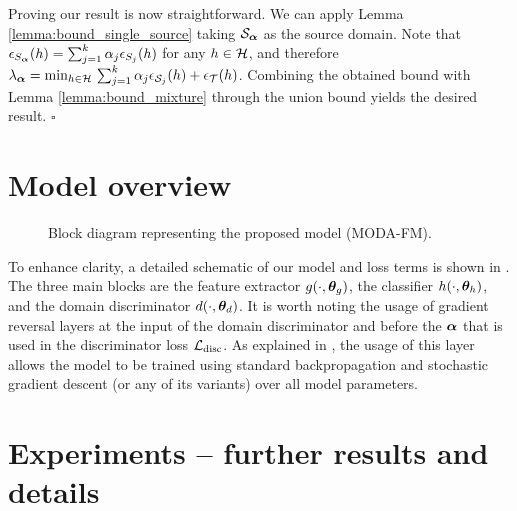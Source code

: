 Proving our result is now straightforward. We can apply Lemma \ref{lemma:bound_single_source} taking ${\mathcal{S}}_{\bm{\alpha}}$ as the source domain. Note that $\epsilon_{S_{\bm{\alpha}}}(h) = \sum_{j=1}^k {\alpha}_j \epsilon_{S_j}(h)$ for any $h \in {\mathcal{H}}$, and therefore $\lambda_{\bm{\alpha}} = \min_{h \in {\mathcal{H}}}\, \sum_{j=1}^k {\alpha}_j\epsilon_{{\mathcal{S}}_j}(h) + \epsilon_{{\mathcal{T}}}(h)$. Combining the obtained bound with Lemma \ref{lemma:bound_mixture} through the union bound yields the desired result. $\square$

\section{Model overview}
\label{sec:model_overview}

\begin{figure}[h!]
	\centering
	\hspace*{-0.30in}
	\scalebox{.69}{}
	\caption{Block diagram representing the proposed model (MODA-FM).}
	\label{fig:model_diagram}
\end{figure}

To enhance clarity, a detailed schematic of our model and loss terms is shown in . The three main blocks are the feature extractor $g(\cdot, {\bm{\theta}}_g)$, the classifier $h(\cdot, {\bm{\theta}}_h)$, and the domain discriminator $d(\cdot, {\bm{\theta}}_d)$. It is worth noting the usage of gradient reversal layers at the input of the domain discriminator and before the ${\bm{\alpha}}$ that is used in the discriminator loss ${\mathcal{L}}_\text{disc}$. As explained in , the usage of this layer allows the model to be trained using standard backpropagation and stochastic gradient descent (or any of its variants) over all model parameters.

\section{Experiments -- further results and details}

